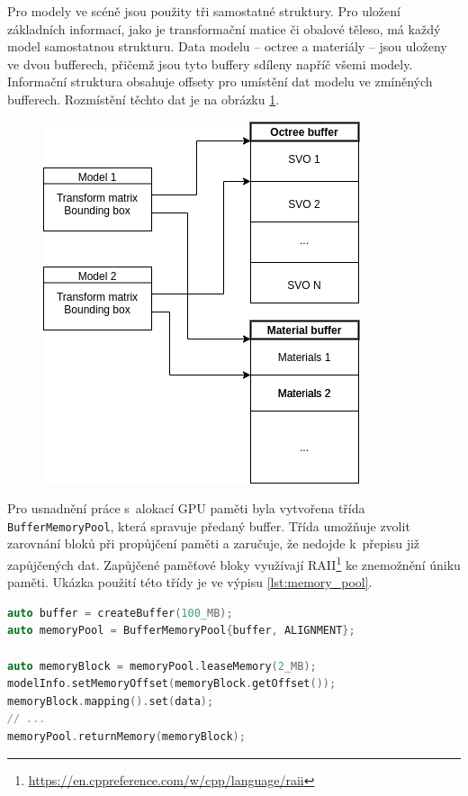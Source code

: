 Pro modely ve scéně jsou použity tři samostatné struktury. Pro uložení základních informací, jako je transformační matice či obalové těleso, má každý model samostatnou strukturu. Data modelu -- octree a materiály -- jsou uloženy ve dvou bufferech, přičemž jsou tyto buffery sdíleny napříč všemi modely. Informační struktura obsahuje offsety pro umístění dat modelu ve zmíněných bufferech. Rozmístění těchto dat je na obrázku \ref{fig:model_storage}.

\begin{figure}[H]
	\centering
	\includegraphics[scale=0.7]{images/model_storage.png}
	\captionsetup{justification=centering}
	\label{fig:model_storage}
\end{figure}

Pro usnadnění práce s~alokací GPU paměti byla vytvořena třída \texttt{BufferMemoryPool}, která spravuje předaný buffer. Třída umožňuje zvolit zarovnání bloků při propůjčení paměti a zaručuje, že nedojde k~přepisu již zapůjčených dat. Zapůjčené paměťové bloky využívají RAII\footnote{\url{https://en.cppreference.com/w/cpp/language/raii}} ke znemožnění úniku paměti.  Ukázka použití této třídy je ve výpisu \ref{lst:memory_pool}.

\begin{lstlisting}[label={lst:memory_pool}, language=C++, caption={Ukázka využití memory pool}]
auto buffer = createBuffer(100_MB);
auto memoryPool = BufferMemoryPool{buffer, ALIGNMENT};

auto memoryBlock = memoryPool.leaseMemory(2_MB);
modelInfo.setMemoryOffset(memoryBlock.getOffset());
memoryBlock.mapping().set(data);
// ...
memoryPool.returnMemory(memoryBlock);
\end{lstlisting}

